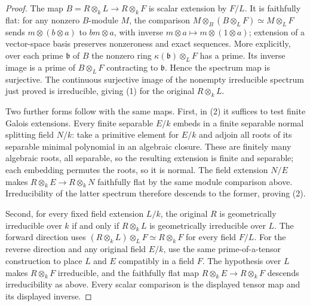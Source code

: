 \begin{proof}
The map $B=R\otimes_k L\to R\otimes_k F$
is scalar extension by $F/L$.
It is faithfully flat: for any
nonzero $B$-module $M$, the
comparison
$M\otimes_B(B\otimes_L F)\simeq M\otimes_L F$
sends $m\otimes(b\otimes a)$ to
$bm\otimes a$, with inverse
$m\otimes a\mapsto m\otimes(1\otimes a)$;
extension of a vector-space
basis preserves nonzeroness
and exact sequences. More
explicitly, over each prime
$\mathfrak b$ of $B$ the
nonzero ring $\kappa(\mathfrak b)\otimes_L F$
has a prime. Its inverse image
is a prime of $B\otimes_L F$
contracting to $\mathfrak b$.
Hence the spectrum map is
surjective. The continuous
surjective image of the
nonempty irreducible spectrum
just proved is irreducible,
giving (1) for the original
$R\otimes_k L$.

Two further forms follow with
the same maps. First, in (2)
it suffices to test finite
Galois extensions. Every finite
separable $E/k$ embeds in a
finite separable normal splitting
field $N/k$: take a primitive
element for $E/k$ and adjoin
all roots of its separable
minimal polynomial in an
algebraic closure. These are
finitely many algebraic roots,
all separable, so the resulting
extension is finite and
separable; each embedding
permutes the roots, so it is
normal. The field extension
$N/E$ makes
$R\otimes_k E\to R\otimes_k N$
faithfully flat by the same
module comparison above.
Irreducibility of the latter
spectrum therefore descends
to the former, proving (2).

Second, for every fixed field
extension $L/k$, the original
$R$ is geometrically irreducible
over $k$ if and only if
$R\otimes_k L$ is geometrically
irreducible over $L$.
The forward direction uses
$(R\otimes_k L)\otimes_L F\simeq R\otimes_k F$
for every field $F/L$.
For the reverse direction and
any original field $E/k$, use
the same prime-of-a-tensor
construction to place $L$ and
$E$ compatibly in a field $F$.
The hypothesis over $L$ makes
$R\otimes_k F$ irreducible,
and the faithfully flat map
$R\otimes_k E\to R\otimes_k F$
descends irreducibility as
above. Every scalar comparison
is the displayed tensor map
and its displayed inverse.
\end{proof}